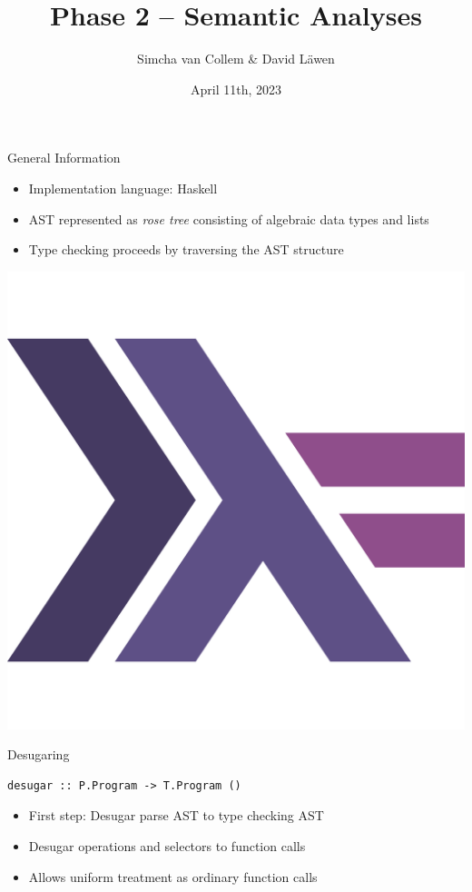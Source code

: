 \documentclass[dvipsnames,aspectratio=169]{beamer}
\title[Phase 2 -- Semantic Analyses]%
{Phase 2 -- Semantic Analyses}
\subtitle
{}
\author%
{Simcha van Collem \& David Läwen}
\institute[]%
{Compiler Construction}
\date[April 11th, 2023] %
{April 11th, 2023}
\begin{document}
\begin{frame}
  \titlepage
\end{frame}

\begin{frame}{General Information}

  \begin{minipage}{.6\textwidth}

    \begin{itemize}
      \item Implementation language: Haskell
      \item AST represented as \emph{rose tree} consisting of algebraic data
            types and lists
      \item Type checking proceeds by traversing the AST structure
    \end{itemize}

  \end{minipage}\hfill
  \begin{minipage}{.3\textwidth}
    \includegraphics[scale=.17]{assets/haskell-icon.pdf}
  \end{minipage}

\end{frame}


\begin{frame}[fragile]{Desugaring}

\begin{verbatim}
desugar :: P.Program -> T.Program ()
\end{verbatim}

\begin{itemize}
  \item First step: Desugar parse AST to type checking AST
  \item Desugar operations and selectors to function calls
  \item Allows uniform treatment as ordinary function calls
\end{itemize}

\end{frame}
\end{document}
